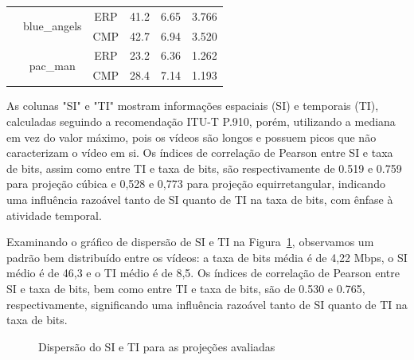 \begin{longtable}{|c|c|c|c|c|c|}
\pagebreak \hline
\multirow{4}{*}{MM} & \multirow{2}{*}{blue\_angels} & ERP &  41.2 &   6.65 &   3.766 \\ \cline{3-6}
                             &                      & CMP &  42.7 &   6.94 &   3.520 \\ \cline{2-6}
   & \multirow{2}{*}{pac\_man}                      & ERP &  23.2 &   6.36 &   1.262 \\ \cline{3-6}
                             &                      & CMP &  28.4 &   7.14 &   1.193 \\
\end{longtable}


As colunas "SI" e "TI" mostram informações espaciais (SI) e temporais (TI), calculadas seguindo a recomendação ITU-T P.910, porém, utilizando a mediana em vez do valor máximo, pois os vídeos são longos e possuem picos que não caracterizam o vídeo em si. Os índices de correlação de Pearson entre SI e taxa de bits, assim como entre TI e taxa de bits, são respectivamente de 0.519 e 0.759 para projeção cúbica e 0,528 e 0,773 para projeção equirretangular, indicando uma influência razoável tanto de SI quanto de TI na taxa de bits, com ênfase à atividade temporal.

Examinando o gráfico de dispersão de SI e TI na Figura~\ref{fig:scatter_si_ti}, observamos um padrão bem distribuído entre os vídeos: a taxa de bits média é de 4,22 Mbps, o SI médio é de 46,3 e o TI médio é de 8,5.  Os índices de correlação de Pearson entre SI e taxa de bits, bem como entre TI e taxa de bits, são de 0.530 e 0.765, respectivamente, significando uma influência razoável tanto de SI quanto de TI na taxa de bits. 

\begin{figure}[h]
\centering
{} %
\quad %
\caption{Dispersão do SI e TI para as projeções avaliadas}
\label{fig:scatter_si_ti}
\end{figure}

